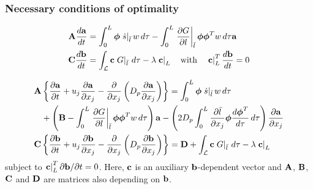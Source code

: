 \documentclass[10pt,xcolor=dvipsnames]{beamer}
\begin{document}
\begin{frame}[t]

  \frametitle{Necessary conditions of optimality}
  
  \begin{align*}
    {\mathbf A} \frac{d{\mathbf a}}{dt} &= \int_{0}^{L} {\boldsymbol \phi} \left.\dot{s}\right|_{\bar{l}} w \, d\tau
    - \int_{0}^{L} \left.\frac{\partial G}{\partial l}\right|_{\bar{l}} {\boldsymbol \phi} {\boldsymbol \phi}^T w \, d\tau {\mathbf a} \\
    {\mathbf C} \frac{d{\mathbf b}}{dt} &= \int_{{\mathcal L}} {\mathbf c} \left.G\right|_{\bar{l}} \, d\tau - \lambda \left.{\mathbf c}\right|_{L}
    \quad\text{with}\quad
    \left.{\mathbf c}\right|_{L}^T \frac{d{\mathbf b}}{dt} = 0
  \end{align*}
  
  \begin{align*}
    &\Abf \left\{\frac{\partial\abf}{\partial t} + u_j \frac{\partial\abf}{\partial x_j} 
    - \frac{\partial}{\partial x_j} \left(D_p \frac{\partial\abf}{\partial x_j}\right) \right\}
    = \int_{0}^{L} \phibf \left.\dot{s}\right|_{\bar{l}} w \, d\tau \\
    &\phantom{\Abf}+ \left(\Bbf - \int_{0}^{L} \left.\frac{\partial G}{\partial l}\right|_{\bar{l}} \phibf \phibf^T w \, d\tau\right) \abf
    - \left(2 D_p \int_{0}^{L} \frac{\partial\bar{l}}{\partial x_j} \phibf \frac{d\phibf^T}{d\tau} \, d\tau\right) \frac{\partial\abf}{\partial x_j} \\
    &\Cbf \left\{\frac{\partial\bbf}{\partial t} + u_j \frac{\partial\bbf}{\partial x_j} - \frac{\partial}{\partial x_j}\left(D_p \frac{\partial\bbf}{\partial x_j}\right)\right\} = 
    \Dbf + \int_{\Lcal} \cbf \left.G\right|_{\bar{l}} \, d\tau - \lambda \left.\cbf\right|_{L}
  \end{align*}
  subject to $\left.{\mathbf c}\right|_{L}^T \partial{\mathbf b}/\partial t = 0$. Here, ${\mathbf c}$ is an auxiliary ${\mathbf b}$-dependent vector and ${\mathbf A}$, ${\mathbf B}$, ${\mathbf C}$ and ${\mathbf D}$ are matrices also depending on ${\mathbf b}$.

\end{frame}

\end{document}
